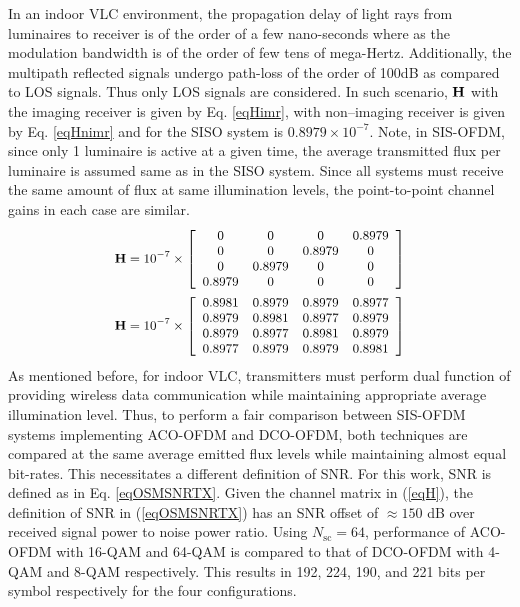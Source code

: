 In an indoor VLC environment, the propagation delay of light rays from luminaires to receiver is of the order of a few nano-seconds where as the modulation bandwidth is of the order of few tens of mega-Hertz. Additionally, the multipath reflected signals undergo path-loss of the order of 100dB as compared to LOS signals. Thus only LOS signals are considered. In such scenario, ${\bf{H}}$ with the imaging receiver is given by Eq. \eqref{eqHimr}, with non--imaging receiver is given by Eq. \eqref{eqHnimr} and for the SISO system is $0.8979\times 10^{-7}$. Note, in SIS-OFDM, since only 1 luminaire is active at a given time, the average transmitted flux per luminaire is assumed same as in the SISO system. Since all systems must receive the same amount of flux at same illumination levels, the point-to-point channel gains in each case are similar.
\begin{subequations}
\small
\begin{align}
	\vm{H} = 10^{-7}\times\left[
	                      \begin{array}{cccc}
												0&0&0&0.8979\\
												0&0&0.8979&0\\
												0&0.8979&0&0\\
												0.8979&0&0&0
												\end{array}
												\right]\label{eqHimr}\\
	\vm{H} = 10^{-7}\times\left[
	                      \begin{array}{cccc}
												0.8981&0.8979&0.8979&0.8977\\
												0.8979&0.8981&0.8977&0.8979\\
												0.8979&0.8977&0.8981&0.8979\\
												0.8977&0.8979&0.8979&0.8981
												\end{array}
												\right]\label{eqHnimr}
\end{align}
\label{eqH}
\end{subequations}
As mentioned before, for indoor VLC, transmitters must perform dual function of providing wireless data communication while maintaining appropriate average illumination level. Thus, to perform a fair comparison between SIS-OFDM systems implementing ACO-OFDM and DCO-OFDM, both techniques are compared at the same average emitted flux levels while maintaining almost equal bit-rates. This necessitates a different definition of SNR. For this work, SNR is defined as in Eq. \eqref{eqOSMSNRTX}. Given the channel matrix in (\ref{eqH}), the definition of SNR in (\ref{eqOSMSNRTX}) has an SNR offset of $\approx 150$ dB over received signal power to noise power ratio. Using $N_{\text{sc}}=64$, performance of ACO-OFDM with 16-QAM and 64-QAM is compared to that of DCO-OFDM with 4-QAM and 8-QAM respectively. This results in 192, 224, 190, and 221 bits per symbol respectively for the four configurations.

